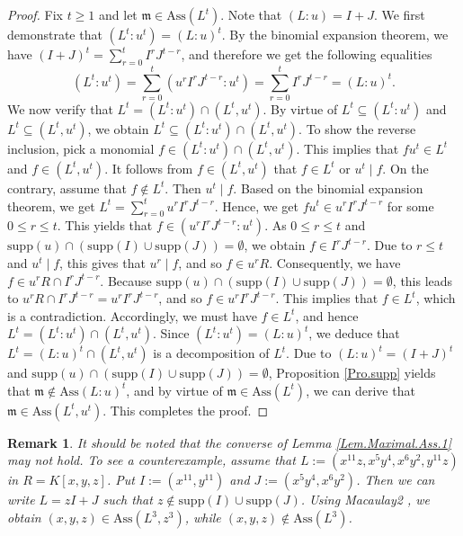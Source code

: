 \documentclass[11pt]{amsart}
\newtheorem{remark}[theorem]{Remark}
\begin{document}
\begin{proof}
 Fix $t\geq 1$ and let $\mathfrak{m}\in \mathrm{Ass}(L^t)$.  Note that $(L:u)=I+J$. We first  demonstrate  that  $(L^t:u^t)=(L:u)^t$.  By 
the binomial expansion theorem, we have  $(I+J)^t=\sum_{r=0}^tI^rJ^{t-r}$, and therefore  we get the following equalities 
  $$(L^t:u^t)=\sum_{r=0}^t (u^r I^r J^{t-r}:u^t)=\sum_{r=0}^t  I^r J^{t-r}=(L:u)^t.$$   
 We now verify that   $L^t=(L^t:u^t) \cap (L^t,u^t)$. By  virtue of  $L^t \subseteq (L^t:u^t)$ and $L^t \subseteq  (L^t,u^t)$,  we obtain    $L^t \subseteq (L^t:u^t) \cap (L^t,u^t)$.  To show  the reverse inclusion, pick a  monomial  $f\in (L^t:u^t) \cap (L^t,u^t)$. This implies that $fu^t \in L^t$ and $f\in (L^t,u^t)$.    It follows from $f\in (L^t, u^t)$ that $f\in L^t$ or $u^t \mid f$.  On the contrary, assume that  $f\notin L^t$.  Then 
  $u^t  \mid  f$.    Based on the binomial expansion theorem,  we get   $L^t=\sum_{r=0}^t u^r I^r J^{t-r}$.  Hence, we get $fu^t \in  u^r I^r J^{t-r}$ for some 
   $0\leq r \leq t$. This yields that  $f \in  (u^r I^r J^{t-r}: u^t)$. As   $0\leq r \leq t$ and $\mathrm{supp}(u) \cap (\mathrm{supp}(I) \cup \mathrm{supp}(J))=\emptyset$, we obtain   $f \in   I^r J^{t-r}$. Due to $r\leq t$ and $u^t \mid f$, this gives that $u^r\mid f$, and so $f\in u^rR$. Consequently, we have 
   $f\in u^rR \cap I^r J^{t-r}$. Because $\mathrm{supp}(u) \cap (\mathrm{supp}(I) \cup \mathrm{supp}(J))=\emptyset$, this leads to 
  $ u^rR \cap I^r J^{t-r}= u^r I^r J^{t-r}$, and so  $f\in u^r I^r J^{t-r}$. This implies that  $f\in L^t$, which is a contradiction. Accordingly, we must have 
$f\in L^t$, and hence $L^t=(L^t:u^t) \cap (L^t,u^t).$ Since $(L^t:u^t)=(L:u)^t$, we deduce that  $L^t=(L:u)^t \cap (L^t,u^t)$ is  a  decomposition of   $L^t$. Due to $(L:u)^t=(I+J)^t$ and $\mathrm{supp}(u) \cap (\mathrm{supp}(I) \cup \mathrm{supp}(J))=\emptyset$, Proposition \ref{Pro.supp} yields that 
  $\mathfrak{m}\notin \mathrm{Ass}(L:u)^t$, and by virtue of $\mathfrak{m}\in \mathrm{Ass}(L^t)$, we can derive that  $\mathfrak{m}\in  \mathrm{Ass}(L^t,u^t)$.   This completes the proof. 
\end{proof}



\begin{remark}
\em{
It should be noted that the converse of Lemma \ref{Lem.Maximal.Ass.1} may not hold. To see a  counterexample, assume that  
 $L:=(x^{11}z, x^5y^4, x^6y^2, y^{11}z)$ in $R=K[x,y,z]$.  Put $I:=(x^{11}, y^{11})$ and $J:=(x^5y^4, x^6y^2)$. Then we can write $L=zI+J$
 such that $z\notin \mathrm{supp}(I) \cup \mathrm{supp}(J)$.  Using {\it Macaulay2} \cite{GS}, we obtain $(x,y,z)\in \mathrm{Ass}(L^3, z^3)$,  while 
 $(x,y,z)\notin \mathrm{Ass}(L^3)$. 
}
\end{remark}
\end{document}
